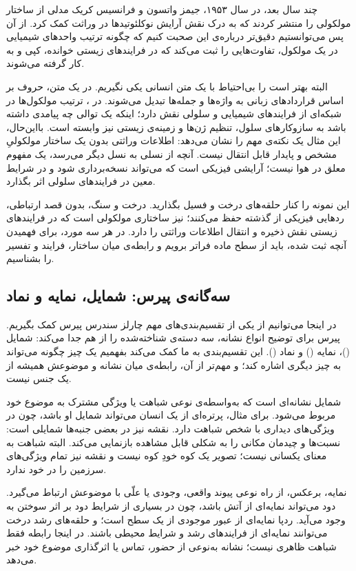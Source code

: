 چند سال بعد، در سال ۱۹۵۳، جیمز واتسون و فرانسیس کریک مدلی از ساختار مولکولی  را منتشر کردند که به درک نقش آرایش نوکلئوتیدها در وراثت کمک کرد. از آن پس می‌توانستیم دقیق‌تر درباره‌ی این صحبت کنیم که چگونه ترتیب واحدهای شیمیایی در یک مولکول، تفاوت‌هایی را ثبت می‌کند که در فرایندهای زیستی خوانده، کپی و به کار گرفته می‌شوند. \autocite{watsoncrick1953}

البته بهتر است  را بی‌احتیاط با یک متن انسانی یکی نگیریم. در یک متن، حروف بر اساس قراردادهای زبانی به واژه‌ها و جمله‌ها تبدیل می‌شوند. در ، ترتیب مولکول‌ها در شبکه‌ای از فرایندهای شیمیایی و سلولی نقش دارد؛ اینکه یک توالی چه پیامدی داشته باشد به سازوکارهای سلول، تنظیم ژن‌ها و زمینه‌ی زیستی نیز وابسته است. بااین‌حال، این مثال یک نکته‌ی مهم را نشان می‌دهد: اطلاعات وراثتی بدون یک ساختار مولکولیِ مشخص و پایدار قابل انتقال نیست. آنچه از نسلی به نسل دیگر می‌رسد، یک مفهوم معلق در هوا نیست؛ آرایشی فیزیکی است که می‌تواند نسخه‌برداری شود و در شرایط معین در فرایندهای سلولی اثر بگذارد.

این نمونه را کنار حلقه‌های درخت و فسیل بگذارید. درخت و سنگ، بدون قصد ارتباطی، ردهایی فیزیکی از گذشته حفظ می‌کنند؛  نیز ساختاری مولکولی است که در فرایندهای زیستی نقش ذخیره و انتقال اطلاعات وراثتی را دارد. در هر سه مورد، برای فهمیدن آنچه ثبت شده، باید از سطح ماده فراتر برویم و رابطه‌ی میان ساختار، فرایند و تفسیر را بشناسیم.

\subsection{سه‌گانه‌ی پیرس: شمایل، نمایه و نماد}
\label{sub:peirce-icon-index-symbol}

در اینجا می‌توانیم از یکی از تقسیم‌بندی‌های مهم چارلز سندرس پیرس کمک بگیریم. پیرس برای توضیح انواع نشانه، سه دسته‌ی شناخته‌شده را از هم جدا می‌کند: شمایل ()، نمایه () و نماد (). این تقسیم‌بندی به ما کمک می‌کند بفهمیم یک چیز چگونه می‌تواند به چیز دیگری اشاره کند؛ و مهم‌تر از آن، رابطه‌ی میان نشانه و موضوعش همیشه از یک جنس نیست. \autocite{peirce-cp,sep-peirce-semiotics}

شمایل نشانه‌ای است که به‌واسطه‌ی نوعی شباهت یا ویژگی مشترک به موضوع خود مربوط می‌شود. برای مثال، پرتره‌ای از یک انسان می‌تواند شمایل او باشد، چون در ویژگی‌های دیداری با شخص شباهت دارد. نقشه نیز در بعضی جنبه‌ها شمایلی است: نسبت‌ها و چیدمان مکانی را به شکلی قابل مشاهده بازنمایی می‌کند. البته شباهت به معنای یکسانی نیست؛ تصویر یک کوه خودِ کوه نیست و نقشه نیز تمام ویژگی‌های سرزمین را در خود ندارد.

نمایه، برعکس، از راه نوعی پیوند واقعی، وجودی یا علّی با موضوعش ارتباط می‌گیرد. دود می‌تواند نمایه‌ای از آتش باشد، چون در بسیاری از شرایط دود بر اثر سوختن به وجود می‌آید. ردپا نمایه‌ای از عبور موجودی از یک سطح است؛ و حلقه‌های رشد درخت می‌توانند نمایه‌ای از فرایندهای رشد و شرایط محیطی باشند. در اینجا رابطه فقط شباهت ظاهری نیست؛ نشانه به‌نوعی از حضور، تماس یا اثرگذاری موضوع خود خبر می‌دهد.

